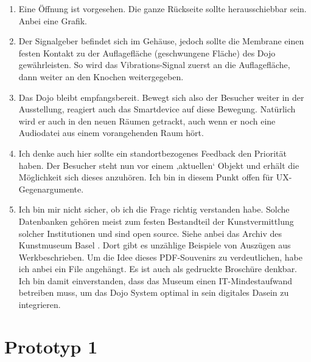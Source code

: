 \begin{enumerate}
\item Eine Öffnung ist vorgesehen. Die ganze Rückseite sollte herausschiebbar sein. Anbei eine Grafik.

\item Der Signalgeber befindet sich im Gehäuse, jedoch sollte die Membrane einen festen Kontakt zu der Auflagefläche (geschwungene Fläche) des Dojo gewährleisten. So wird das Vibrations-Signal zuerst an die Auflagefläche, dann weiter an den Knochen weitergegeben.

\item Das Dojo bleibt empfangsbereit. Bewegt sich also der Besucher weiter in der Ausstellung, reagiert auch das Smartdevice auf diese Bewegung. Natürlich wird er auch in den neuen Räumen getrackt, auch wenn er noch eine Audiodatei aus einem vorangehenden Raum hört.

\item Ich denke auch hier sollte ein standortbezogenes Feedback den Priorität haben. Der Besucher steht nun vor einem ‚aktuellen‘ Objekt und erhält die Möglichkeit sich dieses anzuhören.
Ich bin in diesem Punkt offen für UX-Gegenargumente.

\item Ich bin mir nicht sicher, ob ich die Frage richtig verstanden habe. Solche Datenbanken gehören meist zum festen Bestandteil der Kunstvermittlung solcher Institutionen und sind open source. Siehe anbei das Archiv des Kunstmuseum Basel . Dort gibt es unzählige Beispiele von Auszügen aus Werkbeschrieben. Um die Idee dieses PDF-Souvenirs zu verdeutlichen, habe ich anbei ein File angehängt. Es ist auch als gedruckte Broschüre denkbar. 
Ich bin damit einverstanden, dass das Museum einen IT-Mindestaufwand betreiben muss, um das Dojo System optimal in sein digitales Dasein zu integrieren.



\end{enumerate}

\newpage
  
  
  

\section{Prototyp 1}

